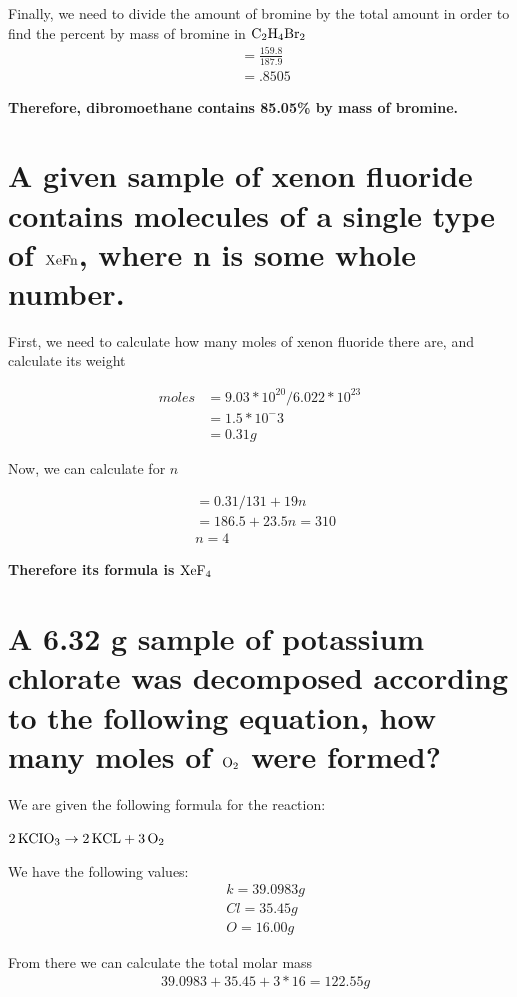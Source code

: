 \documentclass{scrartcl}
\begin{document}
Finally, we need to divide the amount of bromine by the total amount in order to
find the percent by mass of bromine in \(\ce{C2H4Br2}\)
\begin{align*}
&= \frac{159.8}{187.9}\\
&=.8505
\end{align*}

\textbf{Therefore, dibromoethane contains 85.05\% by mass of bromine.}

\section{A given sample of xenon fluoride contains molecules of a single type of \(\ce{XeFn}\), where n is some whole number.}
\label{sec:org533ba7d}
First, we need to calculate how many moles of xenon fluoride there are, and
calculate its weight

\begin{align*}
moles&=9.03*10^{20}/6.022*10^{23}\\
&= 1.5*10^-3\\
&= 0.31g
\end{align*}

Now, we can calculate for \(n\)

\begin{align*}
&= 0.31/131+19n\\
&= 186.5 + 23.5n = 310\\
&n = 4
\end{align*}

\textbf{Therefore its formula is \(\ce{XeF4}\)}

\section{A 6.32 g sample of potassium chlorate was decomposed according to the following equation, how many moles of \(\ce{O2}\) were formed?}
\label{sec:org2ee6d32}
We are given the following formula for the reaction:

\(\ce{2KCIO3} \rightarrow\ce{2KCL}+ \ce{3O2}\)

We have the following values:
\begin{align*}
&k = 39.0983g\\
&Cl = 35.45g\\
&O = 16.00g
\end{align*}

From there we can calculate the total molar mass
\begin{align*}
&39.0983 + 35.45 + 3*16 = 122.55g
\end{align*}
\end{document}
